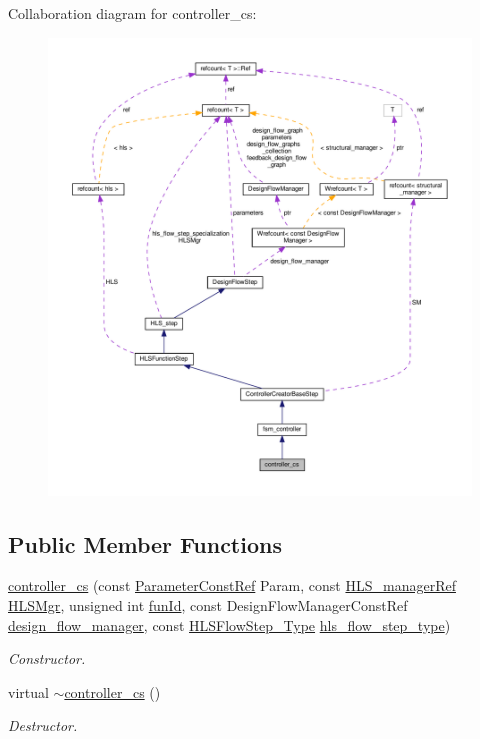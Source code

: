 Collaboration diagram for controller\+\_\+cs\+:
\nopagebreak
\begin{figure}[H]
\begin{center}
\leavevmode
\includegraphics[width=350pt]{d4/d78/classcontroller__cs__coll__graph}
\end{center}
\end{figure}
\subsection*{Public Member Functions}
\begin{DoxyCompactItemize}
\item 
\hyperlink{classcontroller__cs_a54a2b1b31130cad07f1400b56db23e1b}{controller\+\_\+cs} (const \hyperlink{Parameter_8hpp_a37841774a6fcb479b597fdf8955eb4ea}{Parameter\+Const\+Ref} Param, const \hyperlink{hls__manager_8hpp_acd3842b8589fe52c08fc0b2fcc813bfe}{H\+L\+S\+\_\+manager\+Ref} \hyperlink{classHLS__step_ade85003a99d34134418451ddc46a18e9}{H\+L\+S\+Mgr}, unsigned int \hyperlink{classHLSFunctionStep_a3e6434fd86c698b0c70520b859bff5b0}{fun\+Id}, const Design\+Flow\+Manager\+Const\+Ref \hyperlink{classDesignFlowStep_ab770677ddf087613add30024e16a5554}{design\+\_\+flow\+\_\+manager}, const \hyperlink{hls__step_8hpp_ada16bc22905016180e26fc7e39537f8d}{H\+L\+S\+Flow\+Step\+\_\+\+Type} \hyperlink{classHLS__step_aefd59af15346ec3f10bf12bd756e6777}{hls\+\_\+flow\+\_\+step\+\_\+type})
\begin{DoxyCompactList}\small\item\em Constructor. \end{DoxyCompactList}\item 
virtual \hyperlink{classcontroller__cs_af7eaf329397fc69c0541defaa04663fa}{$\sim$controller\+\_\+cs} ()
\begin{DoxyCompactList}\small\item\em Destructor. \end{DoxyCompactList}\end{DoxyCompactItemize}

